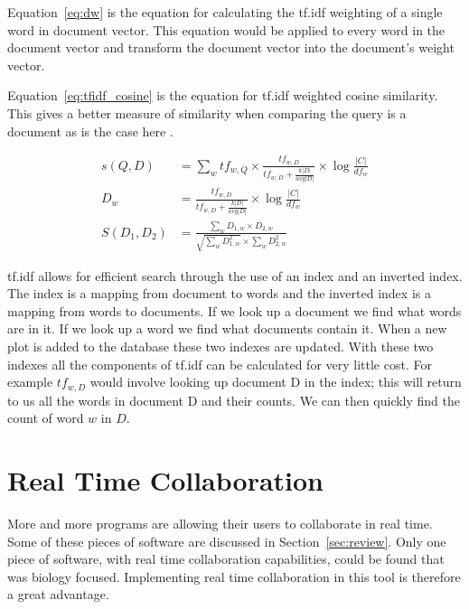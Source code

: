 Equation~\ref{eq:dw} is the equation for calculating the \ac{tf.idf} weighting of a single word in document vector.  This equation would be applied to every word in the document vector and transform the document vector into the document's weight vector.

Equation~\ref{eq:tfidf_cosine} is the equation for \ac{tf.idf} weighted cosine similarity.  This gives a better measure of similarity when comparing the query is a document as is the case here .

\begin{subequations}
    \begin{align}
    s(Q, D) &= \sum_{w} tf_{w,Q} \times \frac{tf_{w,D}}{tf_{w,D} + \frac{k|D|}{avg|D|}} \times \log{\frac{|C|}{df_{w}}} \label{eq:tfidf}\\[6pt]
    D_{w} &= \frac{tf_{w,D}}{tf_{w,D} + \frac{k|D|}{avg|D|}} \times \log{\frac{|C|}{df_{w}}} \label{eq:dw}\\[6pt]
    S(D_{1}, D_{2}) &= \frac{\sum_{w} D_{1,w} \times D_{2,w}}{\sqrt{\sum_{w} D_{1,w}^2} \times \sum_{w} D_{2,w}^2} \label{eq:tfidf_cosine}
    \end{align}
\end{subequations}

\ac{tf.idf} allows for efficient search through the use of an index and an inverted index.  The index is a mapping from document to words and the inverted index is a mapping from words to documents.  If we look up a document we find what words are in it.  If we look up a word we find what documents contain it.  When a new plot is added to the database these two indexes are updated.  With these two indexes all the components of \ac{tf.idf} can be calculated for very little cost.  For example $tf_{w,D}$ would involve looking up document D in the index; this will return to us all the words in document D and their counts.  We can then quickly find the count of word $w$ in $D$.


\section{Real Time Collaboration}
\label{sec:collaboration}

More and more programs are allowing their users to collaborate in real time.  Some of these pieces of software are discussed in Section~\ref{sec:review}.  Only one piece of software, with real time collaboration capabilities, could be found that was biology focused.  Implementing real time collaboration in this tool is therefore a great advantage.

